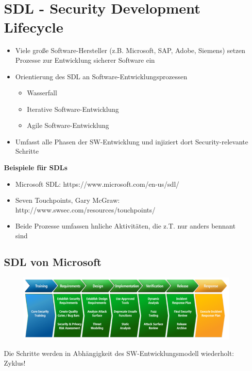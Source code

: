 \documentclass[openany]{book}
\begin{document}
\section{SDL - Security Development Lifecycle}

\begin{itemize}
    \item Viele große Software-Hersteller (z.B. Microsoft, SAP, Adobe, Siemens) setzen Prozesse zur Entwicklung sicherer Software ein
    \item Orientierung des SDL an Software-Entwicklungsprozessen
    \begin{itemize}
        \item Wasserfall
        \item Iterative Software-Entwicklung
        \item Agile Software-Entwicklung
    \end{itemize}
    \item Umfasst alle Phasen der SW-Entwicklung und injiziert dort Security-relevante Schritte
\end{itemize}

\textbf{Beispiele für SDLs}

\begin{itemize}
    \item Microsoft SDL: https://www.microsoft.com/en-us/sdl/
    \item Seven Touchpoints, Gary McGraw: http://www.swsec.com/resources/touchpoints/
    \item Beide Prozesse umfassen hnliche Aktivitäten, die z.T. nur anders bennant sind
\end{itemize}

\subsection{SDL von Microsoft}

\begin{figure}[h!]
    \centering
    \includegraphics[width=0.85\linewidth]{Pics/MicrosoftSDL.PNG}
\end{figure}

Die Schritte werden in Abhängigkeit des SW-Entwicklungsmodell wiederholt: Zyklus!
\end{document}
